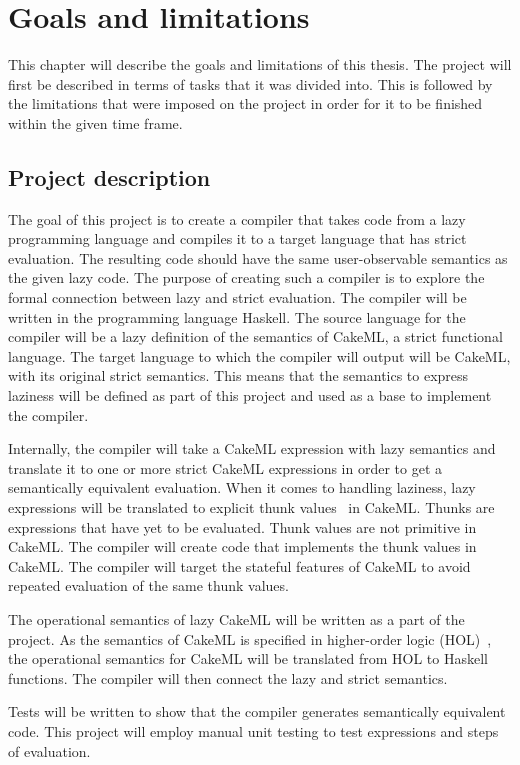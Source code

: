 \chapter{Goals and limitations}
This chapter will describe the goals and limitations of this thesis. The project
will first be described in terms of tasks that it was divided into. This is
followed by the limitations that were imposed on the project in order for it to
be finished within the given time frame.

\section{Project description}
\label{intro:project}
The goal of this project is to create a compiler that takes code from a lazy
programming language and compiles it to a target language that has strict
evaluation. The resulting code should have the same user-observable semantics
as the given lazy code.
The purpose of creating such a compiler is to explore the formal
connection between lazy and strict evaluation. The compiler will be written in
the programming language Haskell. The source language for the compiler will be
a lazy definition of the semantics of CakeML, a strict functional language.
The target language to which the
compiler will output will be CakeML, with its original strict semantics. This
means that the semantics to express laziness will be defined as part of this
project and used as a base to implement the compiler.

Internally, the compiler will take a
CakeML expression with lazy semantics and translate it to one
or more strict CakeML expressions in order to get a semantically equivalent
evaluation. When it comes to handling laziness, lazy expressions will be
translated to explicit thunk values~\cite{Ingerman:1961:TWC:366062.366084} in
CakeML. Thunks are expressions that have yet to be evaluated. Thunk values are
not primitive in CakeML. The compiler will create code that
implements the thunk values in CakeML. The compiler will target the stateful
features of CakeML to avoid repeated evaluation of the same thunk values.

The operational semantics of lazy CakeML will be written as a part of the
project. As the semantics of CakeML is specified in higher-order logic
(HOL)~\cite{HOLInter57:online},
the operational semantics for CakeML will be translated from HOL to Haskell
functions. The compiler will then connect the lazy and strict semantics.

Tests will be written to show that the compiler generates semantically
equivalent code. This project will employ manual unit testing to test
expressions and steps of evaluation.

